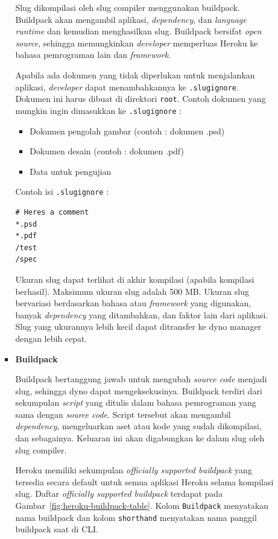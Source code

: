 \documentclass[a4paper,twoside]{article}
\begin{document}
\begin{enumerate}
\begin{enumerate}
\begin{itemize}
Slug dikompilasi oleh slug compiler menggunakan buildpack. Buildpack akan mengambil aplikasi, \textit{dependency}, dan \textit{language runtime} dan kemudian menghasilkan slug. Buildpack bersifat \textit{open source}, sehingga memungkinkan \textit{developer} memperluas Heroku ke bahasa pemrograman lain dan \textit{framework}.

Apabila ada dokumen yang tidak diperlukan untuk menjalankan aplikasi, \textit{developer} dapat menambahkannya ke \texttt{.slugignore}. Dokumen ini harus dibuat di direktori \texttt{root}. Contoh dokumen yang mungkin ingin dimasukkan ke \texttt{.slugignore} :
\begin{itemize}
\item Dokumen pengolah gambar (contoh : dokumen .psd)
\item Dokumen desain (contoh : dokumen .pdf)
\item Data untuk pengujian
\end{itemize}

Contoh isi \texttt{.slugignore} :
\begin{lstlisting}
# Heres a comment
*.psd
*.pdf
/test
/spec
\end{lstlisting}

Ukuran slug dapat terlihat di akhir kompilasi (apabila kompilasi berhasil). Maksimum ukuran slug adalah 500 MB. Ukuran slug bervariasi berdasarkan bahasa atau \textit{framework} yang digunakan, banyak \textit{dependency} yang ditambahkan, dan faktor lain dari aplikasi. Slug yang ukurannya lebih kecil dapat ditransfer ke dyno manager dengan lebih cepat.

				\item \textbf{Buildpack}
		
				Buildpack bertanggung jawab untuk mengubah \textit{source code} menjadi slug, sehingga dyno dapat mengeksekusinya. Buildpack terdiri dari sekumpulan \textit{script} yang ditulis dalam bahasa pemrograman yang sama dengan \textit{source code}. Script tersebut akan mengambil \textit{dependency}, mengeluarkan aset atau kode yang sudah dikompilasi, dan sebagainya. Keluaran ini akan digabungkan ke dalam slug oleh slug compiler.

Heroku memiliki sekumpulan \textit{officially supported buildpack} yang tersedia secara default untuk semua aplikasi Heroku selama kompilasi slug. Daftar \textit{officially supported buildpack} terdapat pada Gambar~\ref{fig:heroku-buildpack-table}. Kolom \texttt{Buildpack} menyatakan nama buildpack dan kolom \texttt{shorthand} menyatakan nama panggil buildpack saat di CLI.


\end{itemize}
\end{enumerate}
\end{enumerate}
\end{document}
